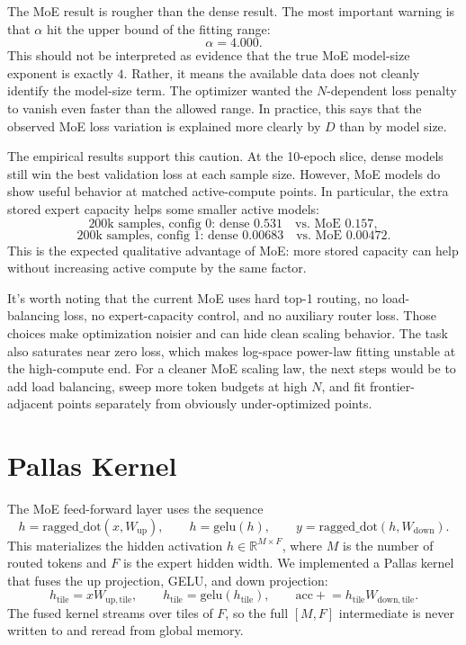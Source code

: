 \documentclass[11pt]{article}
\begin{document}
The MoE result is rougher than the dense result. The most important warning is
that \(\alpha\) hit the upper bound of the fitting range:
\[
  \alpha = 4.000.
\]
This should not be interpreted as evidence that the true MoE model-size
exponent is exactly \(4\). Rather, it means the available data does not cleanly
identify the model-size term. The optimizer wanted the \(N\)-dependent loss
penalty to vanish even faster than the allowed range. In practice, this says
that the observed MoE loss variation is explained more clearly by \(D\) than by
model size.

The empirical results support this caution. At the 10-epoch slice, dense models
still win the best validation loss at each sample size. However, MoE models do
show useful behavior at matched active-compute points. In particular, the extra
stored expert capacity helps some smaller active models:
\[
  \text{200k samples, config 0: dense } 0.531 \quad \text{vs. MoE } 0.157,
\]
\[
  \text{200k samples, config 1: dense } 0.00683 \quad \text{vs. MoE } 0.00472.
\]
This is the expected qualitative advantage of MoE: more stored capacity can help
without increasing active compute by the same factor.

It's worth noting that the current MoE uses hard top-1 routing, no
load-balancing loss, no expert-capacity control, and no auxiliary router loss.
Those choices make optimization noisier and can hide clean scaling behavior.
The task also saturates near zero loss, which makes log-space power-law fitting
unstable at the high-compute end. For a cleaner MoE scaling law, the next steps
would be to add load balancing, sweep more token budgets at high \(N\), and fit
frontier-adjacent points separately from obviously under-optimized points.

\section{Pallas Kernel}

The MoE feed-forward layer uses the sequence
\[
  h = \mathrm{ragged\_dot}(x, W_{\mathrm{up}}),\qquad
  h = \mathrm{gelu}(h),\qquad
  y = \mathrm{ragged\_dot}(h, W_{\mathrm{down}}).
\]
This materializes the hidden activation \(h\in\mathbb{R}^{M\times F}\), where
\(M\) is the number of routed tokens and \(F\) is the expert hidden width. We
implemented a Pallas kernel that fuses the up projection, GELU, and down
projection:
\[
  h_{\mathrm{tile}} = x W_{\mathrm{up},\mathrm{tile}},\qquad
  h_{\mathrm{tile}} = \mathrm{gelu}(h_{\mathrm{tile}}),\qquad
  \mathrm{acc} \mathrel{+}= h_{\mathrm{tile}} W_{\mathrm{down},\mathrm{tile}}.
\]
The fused kernel streams over tiles of \(F\), so the full \([M,F]\) intermediate
is never written to and reread from global memory.
\end{document}
